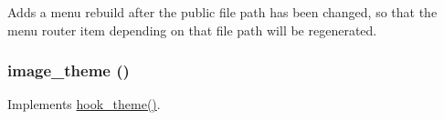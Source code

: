 Adds a menu rebuild after the public file path has been changed, so that the menu router item depending on that file path will be regenerated. \hypertarget{image_8module_a2a6282083e95717d02ac5f79a194f3bb}{
\subsubsection[{image\_\-theme}]{\setlength{\rightskip}{0pt plus 5cm}image\_\-theme ()}}
\label{image_8module_a2a6282083e95717d02ac5f79a194f3bb}
Implements \hyperlink{group__hooks_ga013ccb45c7aaab1c16cf9691428c910d}{hook\_\-theme()}. 